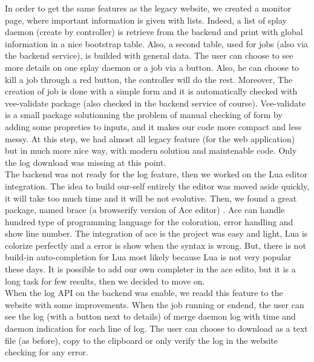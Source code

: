 \documentclass{eplmastersthesis}
\begin{document}
        In order to get the same features as the legacy website, we created a
        monitor page, where important information is given with lists. Indeed,
        a list of splay daemon (create by controller) is retrieve from the
        backend and print with global information in a nice bootstrap table.
        Also, a second table, used for jobs (also via the backend service), is
        builded with general data. The user can choose to see more details on
        one splay daemon or a job via a button. Also, he can choose to kill a
        job through a red button, the controller will do the rest. Moreover, The creation of job is done
        with a simple form and it is automatically checked with vee-validate
        package \cite{VeeValidate} (also checked in the backend service of
        course). Vee-validate is a small package solutionning the problem of
        manual checking of form by adding some propreties to inputs, and it
        makes our code more compact and less messy. At this step, we had
        almost all legacy feature (for the web application) but in much more
        nice way, with modern solution and maintenable code. Only the log
        download was missing at this point. \\

        The backend was not ready for the log feature, then we worked on the Lua editor
        integration. The idea to build our-self entirely the editor was moved aside quickly,
        it will take too much time and it will be not evolutive. Then, we found a
        great package, named brace (a browserify version of Ace editor) \cite{Ace}. Ace
        can handle hundred type of programming language for the coloration, error handling and
        show line number. The integration of ace is the project was easy and light, Lua is
        colorize perfectly and a error is show when the syntax is wrong. But, there is not
        build-in auto-completion for Lua most likely because Lua is not very popular these days.
        It is possible to add our own completer in the ace edito, but it is a long task
        for few results, then we decided to move on. \\

        When the log API on the backend was enable, we readd this feature to the website with some
        improvements. When the job running or endend, the user can see the log (with a button next to details)
        of merge daemon log with time and daemon indication for each line of log. The user can choose to
        download as a text file (as before), copy to the clipboard or only verify the log in
        the website checking for any error. \\
\end{document}
